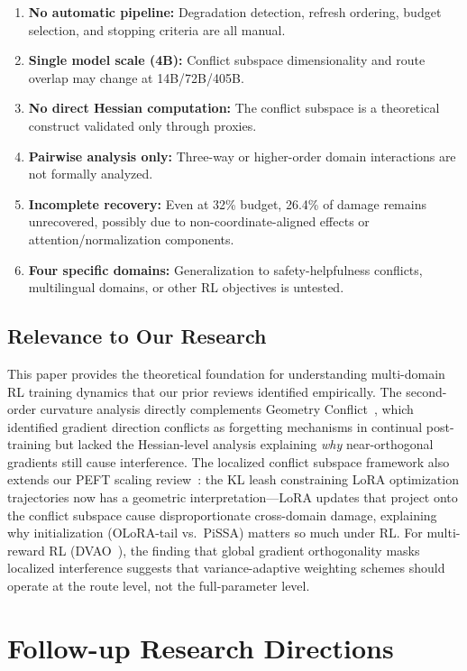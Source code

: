 \documentclass[11pt,a4paper]{article}
\begin{document}
\begin{enumerate}
\item \textbf{No automatic pipeline:} Degradation detection, refresh ordering, budget selection, and stopping criteria are all manual.
\item \textbf{Single model scale (4B):} Conflict subspace dimensionality and route overlap may change at 14B/72B/405B.
\item \textbf{No direct Hessian computation:} The conflict subspace is a theoretical construct validated only through proxies.
\item \textbf{Pairwise analysis only:} Three-way or higher-order domain interactions are not formally analyzed.
\item \textbf{Incomplete recovery:} Even at 32\% budget, 26.4\% of damage remains unrecovered, possibly due to non-coordinate-aligned effects or attention/normalization components.
\item \textbf{Four specific domains:} Generalization to safety-helpfulness conflicts, multilingual domains, or other RL objectives is untested.
\end{enumerate}

\subsection{Relevance to Our Research}

This paper provides the theoretical foundation for understanding multi-domain RL training dynamics that our prior reviews identified empirically. The second-order curvature analysis directly complements Geometry Conflict~\cite{geometry2026}, which identified gradient direction conflicts as forgetting mechanisms in continual post-training but lacked the Hessian-level analysis explaining \emph{why} near-orthogonal gradients still cause interference. The localized conflict subspace framework also extends our PEFT scaling review~\cite{mindlab2026peft}: the KL leash constraining LoRA optimization trajectories now has a geometric interpretation---LoRA updates that project onto the conflict subspace cause disproportionate cross-domain damage, explaining why initialization (OLoRA-tail vs.\ PiSSA) matters so much under RL. For multi-reward RL (DVAO~\cite{dvao2026}), the finding that global gradient orthogonality masks localized interference suggests that variance-adaptive weighting schemes should operate at the route level, not the full-parameter level.

\section{Follow-up Research Directions}
\end{document}
